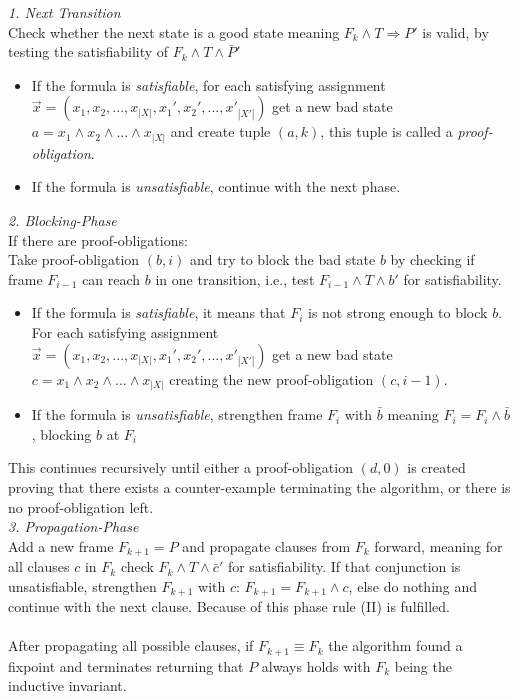 \documentclass[11pt, a4paper, BCOR=10mm, ngerman, oneside]{scrbook}
\begin{document}
\textsl{1. Next Transition} \\ Check whether the next state is a good state meaning $F_k \land T \Rightarrow P'$ is valid, by testing the satisfiability of $F_k \land T \land \bar P'$ 
\begin{itemize}
\item If the formula is \textsl{satisfiable}, for each satisfying assignment \\ $\vec{x} = (x_1, x_2, ..., x_{|X|}, x_1', x_2', ..., x'_{|X'|})$ get a new bad state \\ $a = x_1 \land x_2 \land ... \land x_{|X|}$ and create tuple $(a, k)$, this tuple is called a \textsl{proof-obligation}.

\item If the formula is \textsl{unsatisfiable}, continue with the next phase. \\

\end{itemize}


\textsl{2. Blocking-Phase} \\If there are proof-obligations: \\ 
Take proof-obligation $(b, i)$ and try to block the bad state $b$ by checking if frame $F_{i-1}$ can reach $b$ in one transition, i.e., test $F_{i-1} \land T \land b'$ for satisfiability.

\begin{itemize}
\item If the formula is \textsl{satisfiable}, it means that $F_{i}$ is not strong enough to block $b$. For each satisfying assignment \\ $\vec{x} = (x_1, x_2, ..., x_{|X|}, x_1', x_2', ..., x'_{|X'|})$ get a new bad state \\ $c = x_1 \land x_2 \land ... \land x_{|X|}$ creating the new proof-obligation $(c, i-1)$.

\item If the formula is \textsl{unsatisfiable}, strengthen frame $F_{i}$ with $\bar b$ meaning $F_i = F_i \land \bar b$, blocking $b$ at $F_{i}$ 

\end{itemize}

This continues recursively until either a proof-obligation $(d, 0)$ is created proving that there exists a counter-example terminating the algorithm, or
there is no proof-obligation left. \\

\textsl{3. Propagation-Phase}\\ Add a new frame $F_{k + 1} = P$ and propagate clauses from $F_{k}$ forward, meaning for all clauses $c$ in $F_{k}$ check $F_{k} \land T \land \bar c'$ for satisfiability. If that conjunction is unsatisfiable, strengthen $F_{k+1}$ with $c$: $F_{k+1} = F_{k+1} \land c$, else do nothing and continue with the next clause. Because of this phase rule (II) is fulfilled.\\ \\
After propagating all possible clauses, if $F_{k+1} \equiv F_{k}$ the algorithm found a fixpoint and terminates returning that $P$ always holds with $F_k$ being the inductive invariant. \\ \\
\end{document}
